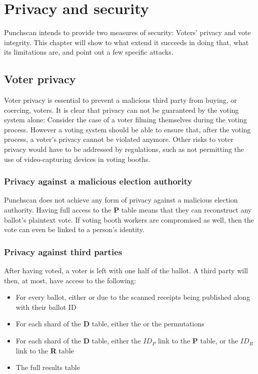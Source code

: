 \chapter{Privacy and security}
\label{ch:security}

Punchscan intends to provide two measures of security: Voters' privacy and vote
integrity. This chapter will show to what extend it succeeds in doing that,
what its limitations are, and point out a few specific attacks.

\section{Voter privacy}

Voter privacy is essential to prevent a malicious third party from buying, or
coercing, voters. It is clear that privacy can not be guaranteed by the voting
system alone: Consider the case of a voter filming themselves during the voting
process. However a voting system should be able to ensure that, after the
voting process, a voter's privacy cannot be violated anymore. Other risks to
voter privacy would have to be addressed by regulations, such as not
permitting the use of video-capturing devices in voting booths.

\subsection{Privacy against a malicious election authority}

Punchscan does not achieve any form of privacy against a malicious election
authority. Having full access to the \textbf{P} table means that they can
reconstruct any ballot's plaintext vote. If voting booth workers are compromised
as well, then the vote can even be linked to a person's identity.

\subsection{Privacy against third parties}

After having voted, a voter is left with one half of the ballot. A third party
will then, at most, have access to the following:
\begin{itemize}
\item For every ballot, either \ptop{} or \pbottom{} due to the scanned receipts being published along with their ballot ID
\item For each shard of the \textbf{D} table, either the \pone{} or the \ptwo{}
permutations
\item For each shard of the \textbf{D} table, either the $ID_P$ link to the
\textbf{P} table, or the $ID_R$ link to the \textbf{R} table
\item The full results table
\end{itemize}

